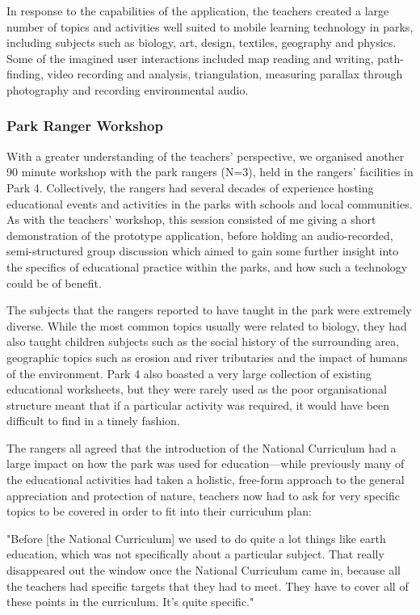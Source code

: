 In response to the capabilities of the application, the teachers created a large number of topics and activities well suited to mobile learning technology in parks, including subjects such as biology, art, design, textiles, geography and physics. Some of the imagined user interactions included map reading and writing, path-finding, video recording and analysis, triangulation, measuring parallax through photography and recording environmental audio.

\subsubsection{Park Ranger Workshop}

With a greater understanding of the teachers’ perspective, we organised another 90 minute workshop with the park rangers (N=3), held in the rangers' facilities in Park 4. Collectively, the rangers had several decades of experience hosting educational events and activities in the parks with schools and local communities. As with the teachers' workshop, this session consisted of me giving a short demonstration of the prototype application, before holding an audio-recorded, semi-structured group discussion which aimed to gain some further insight into the specifics of educational practice within the parks, and how such a technology could be of benefit. 

The subjects that the rangers reported to have taught in the park were extremely diverse. While the most common topics usually were related to biology, they had also taught children subjects such as the social history of the surrounding area, geographic topics such as erosion and river tributaries and the impact of humans of the environment. Park 4 also boasted a very large collection of existing educational worksheets, but they were rarely used as the poor organisational structure meant that if a particular activity was required, it would have been difficult to find in a timely fashion.

The rangers all agreed that the introduction of the National Curriculum had a large impact on how the park was used for education---while previously many of the educational activities had taken a holistic, free-form approach to the general appreciation and protection of nature, teachers now had to ask for very specific topics to be covered in order to fit into their curriculum plan: 

\begin{displayquote}
"Before [the National Curriculum] we used to do quite a lot things like earth education, which was not specifically about a particular subject. That really disappeared out the window once the National Curriculum came in, because all the teachers had specific targets that they had to meet. They have to cover all of these points in the curriculum. It's quite specific."
\end{displayquote}

